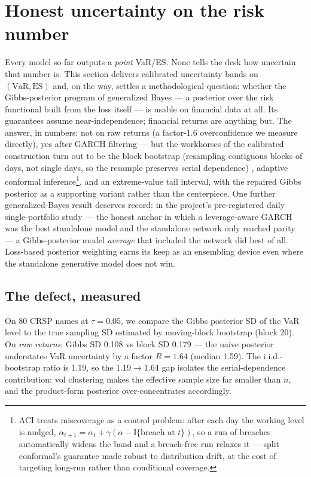 \documentclass[11pt]{article}
\newcommand{\VaR}{\mathrm{VaR}}
\newcommand{\ES}{\mathrm{ES}}
\theoremstyle{remark}
\begin{document}
\section{Honest uncertainty on the risk number}\label{sec:uncertainty}

Every model so far outputs a \emph{point} VaR/ES. None tells the desk
how uncertain that number is. This section delivers calibrated
uncertainty bands on $(\VaR,\ES)$ and, on the way, settles a
methodological question: whether the Gibbs-posterior program of
generalized Bayes \citep{jiang2008gibbs, bissiri2016general} --- a
posterior over the risk functional built from the loss itself --- is
usable on financial data at all. Its guarantees assume
near-independence; financial returns are anything but. The answer, in
numbers: not on raw returns (a factor-1.6 overconfidence we measure
directly), yes after GARCH filtering --- but the workhorses of the
calibrated construction turn out to be the block bootstrap (resampling
contiguous blocks of days, not single days, so the resample preserves
serial dependence) \citep{kunsch1989block}, adaptive conformal
inference\footnote{ACI \citep{gibbs2021aci} treats miscoverage as a
control problem: after each day the working level is nudged,
$\alpha_{t+1} = \alpha_t + \gamma(\alpha - \mathbb{I}\{\text{breach at }
t\})$, so a run of breaches automatically widens the band and a
breach-free run relaxes it --- split conformal's guarantee made robust
to distribution drift, at the cost of targeting long-run rather than
conditional coverage.}, and an extreme-value tail interval, with the
repaired Gibbs posterior as a supporting variant rather than the
centerpiece. One further generalized-Bayes result deserves record: in
the project's pre-registered daily single-portfolio study --- the honest
anchor in which a leverage-aware GARCH was the best standalone model and
the standalone network only reached parity --- a Gibbs-posterior model
\emph{average} that included the network did best of all. Loss-based
posterior weighting earns its keep as an ensembling device even where
the standalone generative model does not win.

\subsection{The defect, measured}

On 80 CRSP names at $\tau = 0.05$, we compare the Gibbs posterior SD of
the VaR level to the true sampling SD estimated by moving-block
bootstrap (block 20). On \emph{raw returns}: Gibbs SD 0.108 vs block SD
0.179 --- the naive posterior understates VaR uncertainty by a factor
$R = 1.64$ (median 1.59). The i.i.d.-bootstrap ratio is 1.19, so the
1.19$\to$1.64 gap isolates the serial-dependence contribution: vol
clustering makes the effective sample size far smaller than $n$, and the
product-form posterior over-concentrates accordingly.
\end{document}
